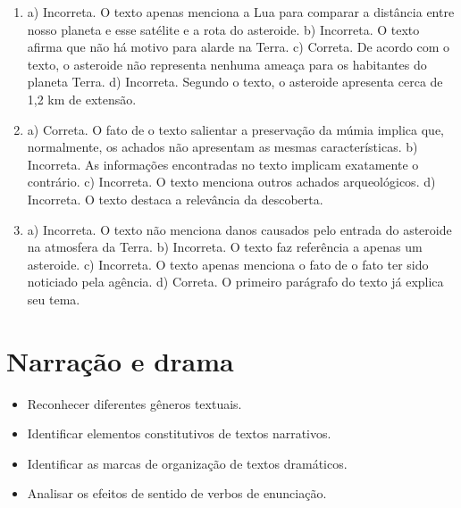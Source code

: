 \begin{enumerate}\color{rosa}
\item a) Incorreta. O texto apenas menciona a Lua para comparar a distância
entre nosso planeta e esse satélite e a rota do asteroide.
b) Incorreta. O texto afirma que não há motivo para alarde na Terra.
c) Correta. De acordo com o texto, o asteroide não representa nenhuma
ameaça para os habitantes do planeta Terra.
d) Incorreta. Segundo o texto, o asteroide apresenta cerca de 1,2 km de
extensão.

\item
a) Correta. O fato de o texto salientar a preservação da múmia implica
que, normalmente, os achados não apresentam as mesmas características.
b) Incorreta. As informações encontradas no texto implicam exatamente o
contrário.
c) Incorreta. O texto menciona outros achados arqueológicos.
d) Incorreta. O texto destaca a relevância da descoberta.


\item
a) Incorreta. O texto não menciona danos causados pelo entrada do
asteroide na atmosfera da Terra.
b) Incorreta. O texto faz referência a apenas um asteroide.
c) Incorreta. O texto apenas menciona o fato de o fato ter sido
noticiado pela agência.
d) Correta. O primeiro parágrafo do texto já explica seu tema.
\end{enumerate}

\chapter{Narração e drama}


\begin{itemize}
\item Reconhecer diferentes gêneros textuais.

\item Identificar elementos constitutivos de textos narrativos.

\item Identificar as marcas de organização de textos dramáticos.

\item Analisar os efeitos de sentido de verbos de enunciação.
\end{itemize}

